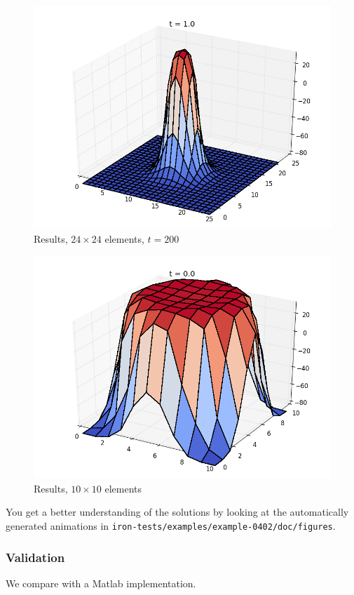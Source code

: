 \begin{figure}[ht]
  \centering
  \includegraphics[width=0.9\columnwidth]{examples/example-0402/doc/figures/current_run_l1x1_n24x24_i1_s0_p1__t200.png} 
  \caption{Results, $24\times 24$ elements, $t=200$}
  \label{example-0402-current-run1-fig}
\end{figure}

\begin{figure}[ht]
  \centering 
  \includegraphics[width=0.9\columnwidth]{examples/example-0402/doc/figures/current_run_l1x1_n10x10_i1_s0_p1__t0.png} 
  \caption{Results, $10 \times 10$ elements}
  \label{example-0402-current-run2-fig}
\end{figure}

You get a better understanding of the solutions by looking at the automatically generated animations in \verb|iron-tests/examples/example-0402/doc/figures|.

%
%
\subsubsection{Validation}
%
We compare with a Matlab implementation.
%
